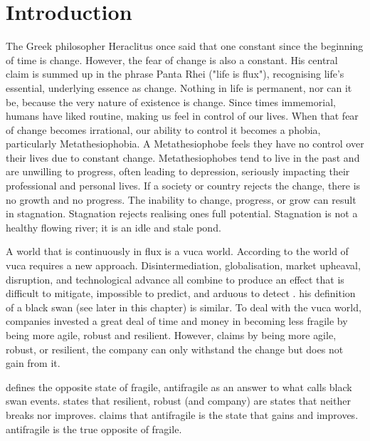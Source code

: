 \chapter{Introduction}
\label{ch:introduction}
The Greek philosopher Heraclitus once said that one constant since the beginning of time is change. However, the fear of change is also a constant.  His central claim is summed up in the phrase Panta Rhei ("life is flux"), recognising life's essential, underlying essence as change. Nothing in life is permanent, nor can it be, because the very nature of existence is change. Since times immemorial, humans have liked routine, making us feel in control of our lives. When that fear of change becomes irrational, our ability to control it becomes a phobia, particularly Metathesiophobia. A Metathesiophobe feels they have no control over their lives due to constant change. Metathesiophobes tend to live in the past and are unwilling to progress, often leading to depression, seriously impacting their professional and personal lives. If a society or country rejects the change, there is no growth and no progress. The inability to change, progress, or grow can result in stagnation. Stagnation rejects realising ones full potential. Stagnation is not a healthy flowing river; it is an idle and stale pond. \parencite{Mark2010, Arapahoe2020}

A world that is continuously in flux is a \acrfull{vuca} world. According to \textcite{Bennett2014} the world of \acrshort{vuca} requires a new approach. Disintermediation, globalisation, market upheaval, disruption, and technological advance all combine to produce an effect that is difficult to mitigate,  impossible to predict, and arduous to detect \parencite[p. 885]{OReilly2019}. \textcite{Taleb2008} his definition of a black swan (see later in this chapter) is similar. To deal with the \acrshort{vuca} world, companies invested a great deal of time and money in becoming less \gls{fragile} by being more \gls{agile}, \gls{robust} and \gls{resilient}. However, \textcite{Taleb2012} claims by being more \gls{agile}, \gls{robust}, or \gls{resilient}, the company can only withstand the change but does not gain from it.

\textcite{Taleb2012} defines the opposite state of \gls{fragile}, \gls{antifragile} as an answer to what \textcite{Taleb2008} calls black swan events. \textcite{Taleb2012} states that \gls{resilient}, \gls{robust} (and company) are states that neither breaks nor improves. \textcite{Taleb2012} claims that \gls{antifragile} is the state that gains and improves. \Gls{antifragile} is the true opposite of \gls{fragile}.

